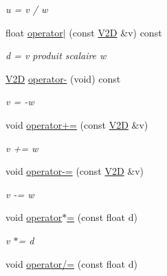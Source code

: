 \begin{DoxyCompactItemize}
\begin{DoxyCompactList}\small\item\em u = v / w \end{DoxyCompactList}\item 
\hypertarget{class_v2_d_af70b4ebebefd254d768e5439a49c7ebd}{float \hyperlink{class_v2_d_af70b4ebebefd254d768e5439a49c7ebd}{operator$|$} (const \hyperlink{class_v2_d}{V2\-D} \&v) const }\label{class_v2_d_af70b4ebebefd254d768e5439a49c7ebd}

\begin{DoxyCompactList}\small\item\em d = v produit scalaire w \end{DoxyCompactList}\item 
\hypertarget{class_v2_d_a47fe35f6dfb99627224f364840018717}{\hyperlink{class_v2_d}{V2\-D} \hyperlink{class_v2_d_a47fe35f6dfb99627224f364840018717}{operator-\/} (void) const }\label{class_v2_d_a47fe35f6dfb99627224f364840018717}

\begin{DoxyCompactList}\small\item\em v = -\/w \end{DoxyCompactList}\item 
\hypertarget{class_v2_d_a4cb584db9232f9f5972cf8c1d0c259ed}{void \hyperlink{class_v2_d_a4cb584db9232f9f5972cf8c1d0c259ed}{operator+=} (const \hyperlink{class_v2_d}{V2\-D} \&v)}\label{class_v2_d_a4cb584db9232f9f5972cf8c1d0c259ed}

\begin{DoxyCompactList}\small\item\em v += w \end{DoxyCompactList}\item 
\hypertarget{class_v2_d_a07332a36c046b9eb453e7b8a7fd9d58c}{void \hyperlink{class_v2_d_a07332a36c046b9eb453e7b8a7fd9d58c}{operator-\/=} (const \hyperlink{class_v2_d}{V2\-D} \&v)}\label{class_v2_d_a07332a36c046b9eb453e7b8a7fd9d58c}

\begin{DoxyCompactList}\small\item\em v -\/= w \end{DoxyCompactList}\item 
\hypertarget{class_v2_d_a852acf979baa56c82b898ffc255ccb75}{void \hyperlink{class_v2_d_a852acf979baa56c82b898ffc255ccb75}{operator$\ast$=} (const float d)}\label{class_v2_d_a852acf979baa56c82b898ffc255ccb75}

\begin{DoxyCompactList}\small\item\em v $\ast$= d \end{DoxyCompactList}\item 
\hypertarget{class_v2_d_a71ea2c9997e9f7707a4f60c9b9555ac0}{void \hyperlink{class_v2_d_a71ea2c9997e9f7707a4f60c9b9555ac0}{operator/=} (const float d)}\label{class_v2_d_a71ea2c9997e9f7707a4f60c9b9555ac0}


\end{DoxyCompactItemize}
